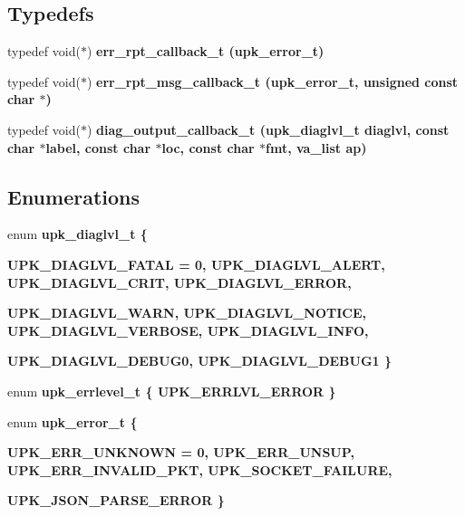 \subsection*{Typedefs}
\begin{CompactItemize}
\item 
typedef void($\ast$) \bf{err\_\-rpt\_\-callback\_\-t} (\bf{upk\_\-error\_\-t})
\item 
typedef void($\ast$) \bf{err\_\-rpt\_\-msg\_\-callback\_\-t} (\bf{upk\_\-error\_\-t}, unsigned const char $\ast$)
\item 
typedef void($\ast$) \bf{diag\_\-output\_\-callback\_\-t} (\bf{upk\_\-diaglvl\_\-t} diaglvl, const char $\ast$label, const char $\ast$loc, const char $\ast$fmt, va\_\-list ap)
\end{CompactItemize}
\subsection*{Enumerations}
\begin{CompactItemize}
\item 
enum \bf{upk\_\-diaglvl\_\-t} \{ \par
\bf{UPK\_\-DIAGLVL\_\-FATAL} =  0, 
\bf{UPK\_\-DIAGLVL\_\-ALERT}, 
\bf{UPK\_\-DIAGLVL\_\-CRIT}, 
\bf{UPK\_\-DIAGLVL\_\-ERROR}, 
\par
\bf{UPK\_\-DIAGLVL\_\-WARN}, 
\bf{UPK\_\-DIAGLVL\_\-NOTICE}, 
\bf{UPK\_\-DIAGLVL\_\-VERBOSE}, 
\bf{UPK\_\-DIAGLVL\_\-INFO}, 
\par
\bf{UPK\_\-DIAGLVL\_\-DEBUG0}, 
\bf{UPK\_\-DIAGLVL\_\-DEBUG1}
 \}
\item 
enum \bf{upk\_\-errlevel\_\-t} \{ \bf{UPK\_\-ERRLVL\_\-ERROR}
 \}
\item 
enum \bf{upk\_\-error\_\-t} \{ \par
\bf{UPK\_\-ERR\_\-UNKNOWN} =  0, 
\bf{UPK\_\-ERR\_\-UNSUP}, 
\bf{UPK\_\-ERR\_\-INVALID\_\-PKT}, 
\bf{UPK\_\-SOCKET\_\-FAILURE}, 
\par
\bf{UPK\_\-JSON\_\-PARSE\_\-ERROR}
 \}
\end{CompactItemize}
